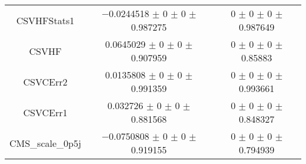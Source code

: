 \begin{table}
\begin{tabular}{ccc}
CSVHFStats1 	& \num{-0.0244518} $\pm$ \num{0} $\pm$ \num{0} $\pm$ \num{0.987275} 	& \num{0} $\pm$ \num{0} $\pm$ \num{0} $\pm$ \num{0.987649}\\
CSVHF 	& \num{0.0645029} $\pm$ \num{0} $\pm$ \num{0} $\pm$ \num{0.907959} 	& \num{0} $\pm$ \num{0} $\pm$ \num{0} $\pm$ \num{0.85883}\\
CSVCErr2 	& \num{0.0135808} $\pm$ \num{0} $\pm$ \num{0} $\pm$ \num{0.991359} 	& \num{0} $\pm$ \num{0} $\pm$ \num{0} $\pm$ \num{0.993661}\\
CSVCErr1 	& \num{0.032726} $\pm$ \num{0} $\pm$ \num{0} $\pm$ \num{0.881568} 	& \num{0} $\pm$ \num{0} $\pm$ \num{0} $\pm$ \num{0.848327}\\
CMS\_scale\_0p5j 	& \num{-0.0750808} $\pm$ \num{0} $\pm$ \num{0} $\pm$ \num{0.919155} 	& \num{0} $\pm$ \num{0} $\pm$ \num{0} $\pm$ \num{0.794939}\\
\bottomrule
\end{tabular}
\end{table}